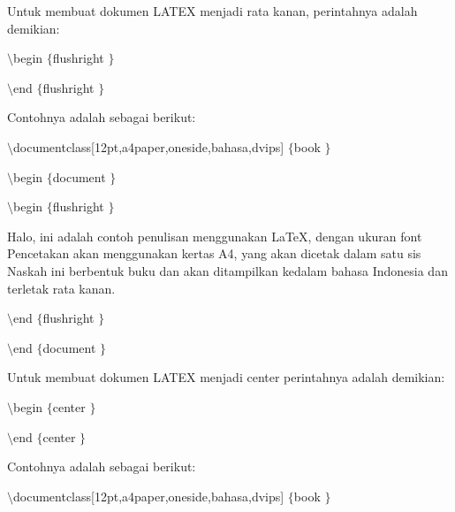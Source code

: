 \vspace{12pt}
Untuk membuat dokumen LATEX menjadi rata kanan, perintahnya adalah demikian: \par
{\fontsize{10pt}{10pt}\selectfont  $  \setminus  $begin $  \{  $flushright $  \}  $} \par
{\fontsize{10pt}{10pt}\selectfont [kalimat]} \par
{\fontsize{10pt}{10pt}\selectfont  $  \setminus  $end $  \{  $flushright $  \}  $} \par
\vspace{12pt}
Contohnya adalah sebagai berikut: \par
{\fontsize{10pt}{10pt}\selectfont  $  \setminus  $documentclass[12pt,a4paper,oneside,bahasa,dvips] $  \{  $book $  \}  $} \par
{\fontsize{10pt}{10pt}\selectfont  $  \setminus  $begin $  \{  $document $  \}  $} \par
{\fontsize{10pt}{10pt}\selectfont  $  \setminus  $begin $  \{  $flushright $  \}  $} \par
\vspace{10pt}
{\fontsize{10pt}{10pt}\selectfont Halo, ini adalah contoh penulisan menggunakan LaTeX, dengan ukuran font Pencetakan akan menggunakan kertas A4, yang akan dicetak dalam satu sis Naskah ini berbentuk buku dan akan ditampilkan kedalam bahasa Indonesia dan terletak rata kanan.} \par
\vspace{10pt}
{\fontsize{10pt}{10pt}\selectfont  $  \setminus  $end $  \{  $flushright $  \}  $} \par
{\fontsize{10pt}{10pt}\selectfont  $  \setminus  $end $  \{  $document $  \}  $} \par
\vspace{10pt}
Untuk membuat dokumen LATEX menjadi center perintahnya adalah demikian: \par
{\fontsize{10pt}{10pt}\selectfont  $  \setminus  $begin $  \{  $center $  \}  $} \par
{\fontsize{10pt}{10pt}\selectfont [kalimat]} \par
{\fontsize{10pt}{10pt}\selectfont  $  \setminus  $end $  \{  $center $  \}  $} \par
\vspace{10pt}
Contohnya adalah sebagai berikut: \par
{\fontsize{10pt}{10pt}\selectfont  $  \setminus  $documentclass[12pt,a4paper,oneside,bahasa,dvips] $  \{  $book $  \}  $ \hspace*{0.5in} } \par
